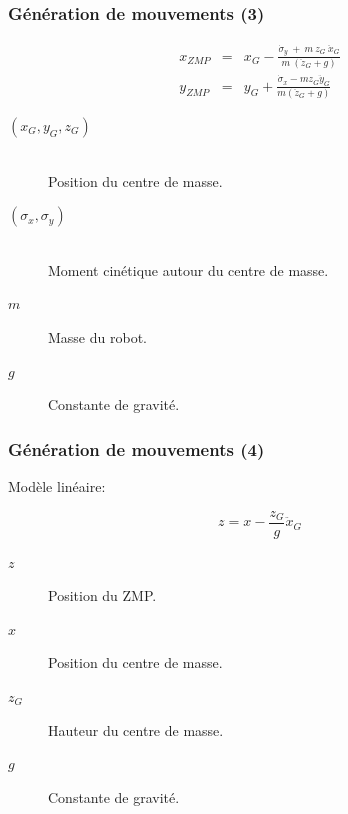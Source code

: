 \documentclass[14pt,utf8x,hyperref={pdfpagelabels=false}]{beamer}
\begin{document}
\begin{slideDecision}
  \frametitle{Génération de mouvements (3)}
  \begin{changeleftmargin}{1.1cm}
  \begin{center}
    \begin{equation*}
    \begin{array}{lll}
    x_{ZMP} &=& x_G -
    \frac{\dot{\sigma}_y\ +\ m\ z_G\ \ddot{x}_G}{m\ (\ddot{z}_G + g)}\\
    y_{ZMP} &=& y_G +
    \frac{\dot{\sigma}_x - m z_G \ddot{y}_G}{m (\ddot{z}_G + g)}
    \end{array}
  \end{equation*}

  \end{center}

  \begin{description}
    \item[$(x_G, y_G, z_G)$]~\\
      Position du centre de masse.
    \item[$(\sigma_x, \sigma_y)$]~\\
      Moment cinétique autour du centre de masse.
    \item[$m$] Masse du robot.
    \item[$g$] Constante de gravité.
  \end{description}

  \end{changeleftmargin}
\end{slideDecision}

\begin{slideDecision}
  \frametitle{Génération de mouvements (4)}
  \begin{changeleftmargin}{1.1cm}
  \begin{center}

    Modèle linéaire:

    \begin{equation*}
      z = x - \frac{z_G}{g} \ddot{x}_G
    \end{equation*}

    \begin{description}
    \item[$z$] Position du ZMP.
    \item[$x$] Position du centre de masse.
    \item[$z_G$] Hauteur du centre de masse.
    \item[$g$] Constante de gravité.
    \end{description}
  \end{center}
  \end{changeleftmargin}
\end{slideDecision}
\end{document}
